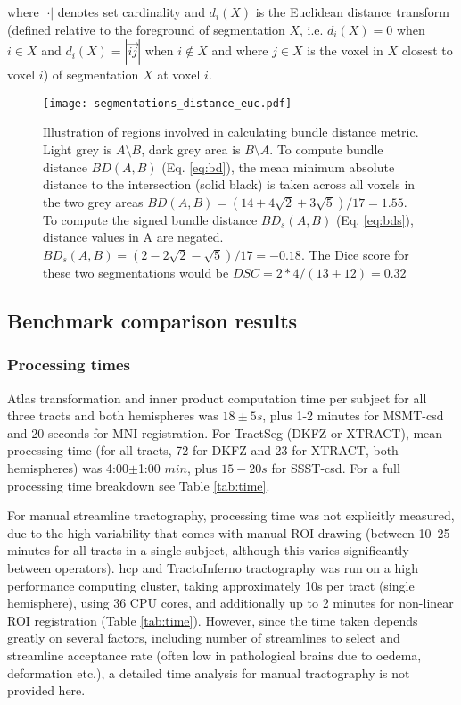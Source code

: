 where $| \cdot |$ denotes set cardinality and $d_i(X)$ is the Euclidean distance transform (defined relative to the foreground of segmentation $X$, i.e. $d_i(X) = 0$ when $i \in X $ and $d_i(X) = |\overrightarrow{ij}|$ when $i \not\in X$ and where $j \in X$ is the voxel in $X$ closest to voxel $i$)  of segmentation $X$ at voxel $i$.

\begin{figure}
  \centering
  \texttt{[image: segmentations\_distance\_euc.pdf]}
  \caption{Illustration of regions involved in calculating bundle distance metric. Light grey is $A\setminus B$, dark grey area is $B\setminus A$. To compute bundle distance $BD(A,B)$ (Eq. \ref{eq:bd}), the mean minimum absolute distance to the intersection (solid black) is taken across all voxels in the two grey areas $BD(A,B) = (14+4\sqrt{2}+3\sqrt{5})/17 = 1.55$. To compute the signed bundle distance $BD_s(A,B)$ (Eq. \ref{eq:bds}), distance values in A are negated. $BD_s(A,B) = (2-2\sqrt{2}-\sqrt{5})/17 = -0.18$. The Dice score for these two segmentations would be $DSC = 2*4/(13+12) = 0.32$}
  \label{fig:BD}
\end{figure}

\subsection{Benchmark comparison results}

\subsubsection{Processing times}

Atlas transformation and inner product computation time per subject for all three tracts and both hemispheres was $18\pm5 s$, plus 1-2 minutes for MSMT-\gls{csd} and 20 seconds for MNI registration.
For TractSeg (DKFZ or XTRACT), mean processing time (for all tracts, 72 for DKFZ and 23 for XTRACT, both hemispheres) was 4:00$\pm$1:00 $min$, plus $15-20 s$ for SSST-\gls{csd}.
For a full processing time breakdown see Table \ref{tab:time}.

For manual streamline tractography, processing time was not explicitly measured, due to the high variability that comes with manual ROI drawing (between 10--25 minutes for all tracts in a single subject, although this varies significantly between operators).
\Gls{hcp} and TractoInferno tractography was run on a high performance computing cluster, taking approximately 10s per tract (single hemisphere), using 36 CPU cores, and additionally up to 2 minutes for non-linear ROI registration (Table \ref{tab:time}).
However, since the time taken depends greatly on several factors, including number of streamlines to select and streamline acceptance rate (often low in pathological brains due to oedema, deformation etc.), a detailed time analysis for manual tractography is not provided here.


